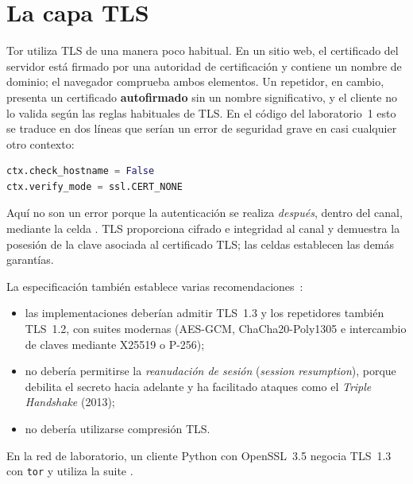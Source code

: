 \section{La capa TLS}\label{sec:canale-tls}

Tor utiliza TLS de una manera poco habitual. En un sitio web, el certificado del servidor está firmado por una autoridad de certificación y contiene un nombre de dominio; el navegador comprueba ambos elementos. Un repetidor, en cambio, presenta un certificado \textbf{autofirmado} sin un nombre significativo, y el cliente no lo valida según las reglas habituales de TLS. En el código del laboratorio~1 esto se traduce en dos líneas que serían un error de seguridad grave en casi cualquier otro contexto:

\begin{lstlisting}[language=Python,numbers=none]
ctx.check_hostname = False
ctx.verify_mode = ssl.CERT_NONE
\end{lstlisting}

Aquí no son un error porque la autenticación se realiza \emph{después}, dentro del canal, mediante la celda . TLS proporciona cifrado e integridad al canal y demuestra la posesión de la clave asociada al certificado TLS; las celdas establecen las demás garantías.

La especificación también establece varias recomendaciones~:
\begin{itemize}
  \item las implementaciones deberían admitir TLS~1.3 y los repetidores también TLS~1.2, con suites modernas (AES-GCM, ChaCha20-Poly1305 e intercambio de claves mediante X25519 o P-256);
  \item no debería permitirse la \emph{reanudación de sesión} (\emph{session resumption}), porque debilita el secreto hacia adelante y ha facilitado ataques como el \emph{Triple Handshake} (2013);
  \item no debería utilizarse compresión TLS.
\end{itemize}

En la red de laboratorio, un cliente Python con OpenSSL~3.5 negocia TLS~1.3 con \texttt{tor} y utiliza la suite .

